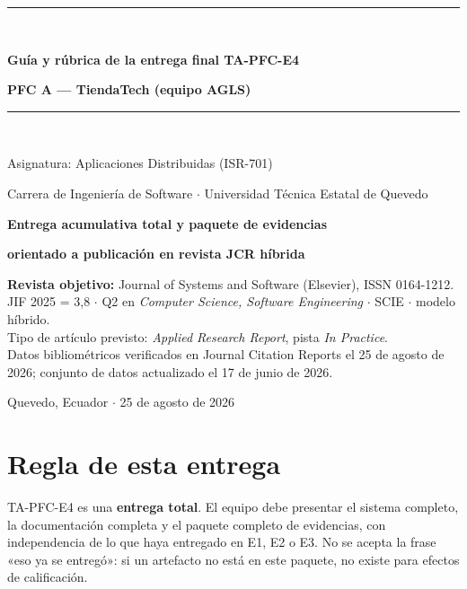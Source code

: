 \documentclass[11pt,a4paper]{article}
\begin{document}
\begin{titlepage}
	\centering
	\vspace*{1.2cm}
	{\color{azulUTEQ}\rule{\textwidth}{2pt}}\\[10pt]
	{\LARGE\bfseries\color{azulUTEQ} Guía y rúbrica de la entrega final TA-PFC-E4\par}
	\vspace{8pt}
	{\Large\bfseries\color{azulUTEQ} PFC A --- TiendaTech (equipo AGLS)\par}
	\vspace{10pt}
	{\color{azulUTEQ}\rule{\textwidth}{2pt}}\\[16pt]
	{\large Asignatura: Aplicaciones Distribuidas (ISR-701)\par}
	\vspace{4pt}
	{\large Carrera de Ingeniería de Software $\cdot$ Universidad Técnica Estatal de Quevedo\par}
	\vspace{26pt}
	{\large\bfseries Entrega acumulativa total y paquete de evidencias\par}
	{\large\bfseries orientado a publicación en revista JCR híbrida\par}
	\vspace{26pt}
	\begin{minipage}{0.86\textwidth}
		\centering
		\color{grisTexto}
		\small
		\textbf{Revista objetivo:} Journal of Systems and Software (Elsevier), ISSN 0164-1212.\\
		JIF 2025 = 3,8 $\cdot$ Q2 en \emph{Computer Science, Software Engineering} $\cdot$ SCIE $\cdot$ modelo híbrido.\\[6pt]
		Tipo de artículo previsto: \emph{Applied Research Report}, pista \emph{In Practice}.\\[6pt]
		Datos bibliométricos verificados en Journal Citation Reports el 25 de agosto de 2026; conjunto de datos actualizado el 17 de junio de 2026.
	\end{minipage}
	\vfill
	{\small Quevedo, Ecuador $\cdot$ 25 de agosto de 2026\par}
\end{titlepage}

\tableofcontents
\newpage

\section{Regla de esta entrega}

TA-PFC-E4 es una \textbf{entrega total}. El equipo debe presentar el sistema completo, la documentación completa y el paquete completo de evidencias, con independencia de lo que haya entregado en E1, E2 o E3. No se acepta la frase «eso ya se entregó»: si un artefacto no está en este paquete, no existe para efectos de calificación.
\end{document}
